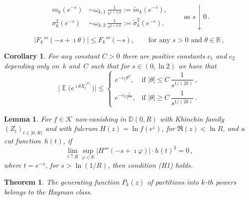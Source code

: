 \documentclass[10pt,a4paper]{amsart}
\newtheorem{corollaryL}{Corollary}
\newtheorem{lemma}{Lemma}
\newtheorem{theorem}{Theorem}
\DeclareMathOperator{\E}{\mathbb{E}}
\begin{document}
\begin{equation}\label{eq:mkasympt}
\begin{aligned}
m_k(e^{-s}) &\sim \omega_{k,1}\,\frac{1}{s^{1+1/k}} := \tilde{m}_k(e^{-s}),\\[4pt]
\sigma_k^2(e^{-s}) &\sim \omega_{k,2}\,\frac{1}{s^{2+1/k}} := \tilde{\sigma}_k^2(e^{-s}),
\end{aligned}
\qquad \text{as } s\downarrow 0\,.
\end{equation}

\begin{equation}\label{eq:F3bound}
|F_k'''(-s+\imath \theta)| \le F_k'''(-s), \qquad \text{for any } s>0 \text{ and } \theta\in\mathbb{R}\,,
\end{equation}

\begin{corollaryL}\label{cor:bounds for char Pk}
For any constant $C>0$ there are positive constants $c_1$ and $c_2$ depending
only on~$k$ and~$C$ such that for $s\in(0,\ln 2)$ we have that
\[
\big|\E\!\big(e^{\imath \theta\breve{X}^{[k]}_t}\big)\big| \le
\begin{cases}
e^{-c_1\theta^2}, & \text{if } |\theta|\le C\,\dfrac{1}{s^{1/(2k)}}\,,\\[8pt]
e^{-c_2\frac{1}{s^{1/k}}}, & \text{if } |\theta|\ge C\,\dfrac{1}{s^{1/(2k)}}\,.
\end{cases}
\]
\end{corollaryL}

\begin{lemma}\label{lem:majorarc}
For $f\in\mathcal{K}$ \emph{non-vanishing} in $\mathbb{D}(0,R)$ with Khinchin family $(Z_t)_{t\in[0,R)}$ and
with fulcrum $H(z) = \ln f(e^z)$, for $\Re(z)<\ln R$, and a cut function~$h(t)$, if
\begin{equation}\label{eq:majorarccond}
\lim_{t\uparrow R} \sup_{\varphi\in\mathbb{R}} |H'''(-s+\imath\varphi)| \cdot h(t)^3 = 0\,,
\end{equation}
where $t=e^{-s}$, for $s>\ln(1/R)$, then condition \textup{(H1)} holds.
\end{lemma}

\begin{theorem}\label{thm:Hayman}
The generating function $P_k(z)$ of partitions into $k$-th powers belongs to
the Hayman class.
\end{theorem}
\end{document}
